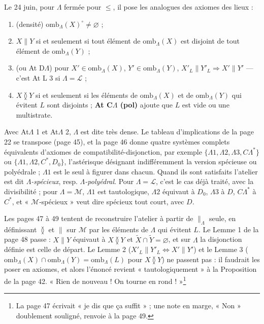 \documentclass[11pt,a4paper]{article}
\begin{document}
Le 24 juin, pour $\Lambda$ fermée pour $\leq$, il pose les analogues des axiomes
des lieux :
\begin{enumerate}
\item[\textbf{At$\Lambda$ 1}] (densité) $\mathrm{omb}_{\Lambda}(X)^{\circ} \neq
\varnothing$ ;
\item[\textbf{At$\Lambda$ 2}] $X \parallel Y$ si et seulement si tout élément de
$\mathrm{omb}_{\Lambda}(X)$ est disjoint de tout élément de
$\mathrm{omb}_{\Lambda}(Y)$ ;
\item[\textbf{At$\Lambda$ 3}] (ou At D$\Lambda$) pour $X' \in
\mathrm{omb}_{\Lambda}(X)$, $Y' \in \mathrm{omb}_{\Lambda}(Y)$, $X'_{L} \parallel
Y'_{L} \Rightarrow X' \parallel Y'$ --- c'est At L 3 si $\Lambda = \mathcal{L}$ ;
\item[\textbf{At C$\Lambda$ (spéc)}] $X \between Y$ si et seulement si les éléments
de $\mathrm{omb}_{\Lambda}(X)$ et de $\mathrm{omb}_{\Lambda}(Y)$ qui évitent $L$
sont disjoints ; \textbf{At C$\Lambda$ (pol)} ajoute que $L$ est vide ou une
multistrate.
\end{enumerate}
Avec At$\Lambda$ 1 et At$\Lambda$ 2, $\Lambda$ est dite très dense. Le tableau
d'implications de la page 22 se transpose (page 45), et la page 46 donne quatre
systèmes complets équivalents d'axiomes de compatibilité-disjonction, par
exemple $\{\Lambda 1, \Lambda 2, \Lambda 3, C\Lambda^{*}\}$ ou $\{\Lambda 1,
\Lambda 2, C^{*}, D_{0}\}$, l'astérisque désignant indifféremment la version
spécieuse ou polyédrale ; $\Lambda 1$ est le seul à figurer dans chacun. Quand
ils sont satisfaits l'atelier est dit \emph{$\Lambda$-spécieux}, resp.
\emph{$\Lambda$-polyédral}. Pour $\Lambda = \mathcal{L}$, c'est le cas déjà
traité, avec la divisibilité ; pour $\Lambda = \mathcal{M}$, $\Lambda 1$ est
tautologique, $\Lambda 2$ équivaut à $D_{0}$, $\Lambda 3$ à $D$, $C\Lambda^{*}$ à
$C^{*}$, et « $\mathcal{M}$-spécieux » veut dire spécieux tout court, avec $D$.

Les pages 47 à 49 tentent de reconstruire l'atelier à partir de
$\parallel_{\Lambda}$ seule, en définissant $\between$ et $\parallel$ sur
$\mathcal{M}$ par les éléments de $\Lambda$ qui évitent $L$. Le Lemme 1 de la page
48 passe : $X \parallel Y$ équivaut à $X \between Y$ et $\widetilde{X} \cap
\widetilde{Y} = \varnothing$, et sur $\Lambda$ la disjonction définie est celle de
départ. Le Lemme 2 ($X'_{L} \parallel Y'_{L} \iff X' \parallel Y'$) et le Lemme 3
($\mathrm{omb}_{\Lambda}(X) \cap \mathrm{omb}_{\Lambda}(Y) =
\mathrm{omb}_{\Lambda}(L)$ pour $X \between Y$) ne passent pas : il faudrait les
poser en axiomes, et alors l'énoncé revient « tautologiquement » à la Proposition
de la page 42. « Rien de nouveau ! On tourne en rond ! »\footnote{La page 47
écrivait « je dis que ça suffit » ; une note en marge, « Non » doublement
souligné, renvoie à la page 49.}
\end{document}
